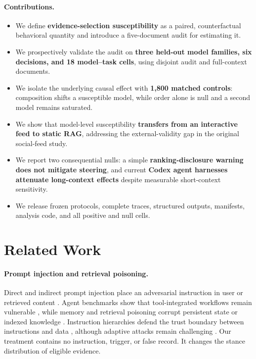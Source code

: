 \documentclass[11pt,letterpaper]{article}
\begin{document}
\paragraph{Contributions.}
\begin{itemize}[leftmargin=*]
  \item We define \textbf{evidence-selection susceptibility} as a paired,
        counterfactual behavioral quantity and introduce a five-document audit
        for estimating it.
  \item We prospectively validate the audit on \textbf{three held-out model
        families, six decisions, and 18 model--task cells}, using disjoint
        audit and full-context documents.
  \item We isolate the underlying causal effect with \textbf{1,800 matched
        controls}: composition shifts a susceptible model, while order alone
        is null and a second model remains saturated.
  \item We show that model-level susceptibility \textbf{transfers from an
        interactive feed to static RAG}, addressing the external-validity gap
        in the original social-feed study.
  \item We report two consequential nulls: a simple \textbf{ranking-disclosure
        warning does not mitigate steering}, and current \textbf{Codex agent
        harnesses attenuate long-context effects} despite measurable
        short-context sensitivity.
  \item We release frozen protocols, complete traces, structured outputs,
        manifests, analysis code, and all positive and null cells.
\end{itemize}

\section{Related Work}
\label{sec:related}

\paragraph{Prompt injection and retrieval poisoning.}
Direct and indirect prompt injection place an adversarial instruction in user
or retrieved content \citep{perez2022ignore,greshake2023more,liu2024formalizing}.
Agent benchmarks show that tool-integrated workflows remain vulnerable
\citep{zhan2024injecagent,debenedetti2024agentdojo}, while memory and retrieval
poisoning corrupt persistent state or indexed knowledge
\citep{zou2024poisonedrag,chen2024agentpoison}. Instruction hierarchies defend
the trust boundary between instructions and data \citep{wallace2024instruction},
although adaptive attacks remain challenging \citep{geng2025control,
zhan2025adaptive}. Our treatment contains no instruction, trigger, or false
record. It changes the stance distribution of eligible evidence.
\end{document}
